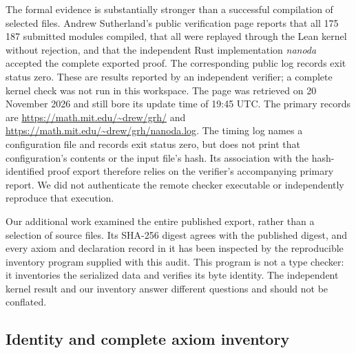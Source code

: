 \documentclass[11pt,a4paper]{article}
\theoremstyle{remark}
\begin{document}
The formal evidence is substantially stronger than a successful compilation of
selected files.  Andrew Sutherland's public verification page reports that all
175\,187 submitted modules compiled, that all were replayed through the Lean
kernel without rejection, and that the independent Rust implementation
\emph{nanoda} accepted the complete exported proof.  The corresponding public
log records exit status zero.  These are results reported by an independent
verifier; a complete kernel check was not run in this workspace.  The page was
retrieved on 20 November 2026 and still bore its update time of 19:45 UTC.
The primary records are
\url{https://math.mit.edu/~drew/grh/} and
\url{https://math.mit.edu/~drew/grh/nanoda.log}.
The timing log names a configuration file and records exit status zero,
but does not print that configuration's contents or the input file's hash.
Its association with the hash-identified proof export therefore relies on
the verifier's accompanying primary report. We did not authenticate the
remote checker executable or independently reproduce that execution.

Our additional work examined the entire published export, rather than a
selection of source files.  Its SHA-256 digest agrees with the published digest,
and every axiom and declaration record in it has been inspected by the
reproducible inventory program supplied with this audit.  This program is not
a type checker: it inventories the serialized data and verifies its byte
identity.  The independent kernel result and our inventory answer different
questions and should not be conflated.

\subsection{Identity and complete axiom inventory}
\end{document}
